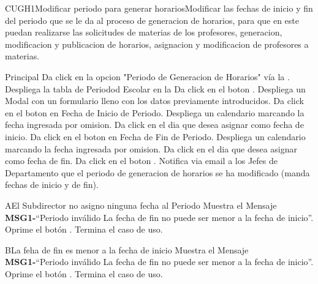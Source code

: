	\begin{UseCase}{CUGH1}{Modificar periodo para generar horarios}{Modificar las fechas de inicio y fin del periodo que se le da al proceso de generacion de horarios, para que en este puedan realizarse las solicitudes de materias de los profesores, generacion, modificacion y publicacion de horarios, asignacion y modificacion de profesores a materias.}
	\end{UseCase}
  
	\begin{UCtrayectoria}{Principal}
		\UCpaso[\UCactor] Da click en la opcion "Periodo de Generacion de Horarios" vía la \label{CULogin}.
		\UCpaso           Despliega la tabla de Periodod Escolar en la 
		\UCpaso[\UCactor] Da click en el boton .
		\UCpaso           Despliega un Modal con un formulario lleno con los datos previamente introducidos.
		\UCpaso[\UCactor] Da click en el boton  en Fecha de Inicio de Periodo.
		\UCpaso           Despliega un calendario marcando la fecha ingresada por omision.
		\UCpaso[\UCactor] Da click en el dia que desea asignar como fecha de inicio.     
		\UCpaso[\UCactor] Da click en el boton  en Fecha de Fin de Periodo.
		\UCpaso           Despliega un calendario marcando la fecha ingresada por omision.
		\UCpaso[\UCactor] Da click en el dia que desea asignar como fecha de fin.     
		\UCpaso[\UCactor] Da click en el boton .
		\UCpaso           Notifica via email a los Jefes de Departamento que el periodo de generacion de horarios se ha modificado (manda fechas de inicio y de fin).
	\end{UCtrayectoria}
    
	\begin{UCtrayectoriaA}{A}{El Subdirector no asigno ninguna fecha al Periodo}
		\UCpaso 	  Muestra el Mensaje {\bf MSG1-}``Periodo inválido La fecha de fin no puede ser menor a la fecha de inicio''.
		\UCpaso[\UCactor] Oprime el botón .
		\UCpaso[] Termina el caso de uso.
	\end{UCtrayectoriaA}

	\begin{UCtrayectoriaA}{B}{La feha de fin es menor a la fecha de inicio}
		\UCpaso 	  Muestra el Mensaje {\bf MSG1-}``Periodo inválido La fecha de fin no puede ser menor a la fecha de inicio''.
		\UCpaso[\UCactor] Oprime el botón .
		\UCpaso[] Termina el caso de uso.
	\end{UCtrayectoriaA}
